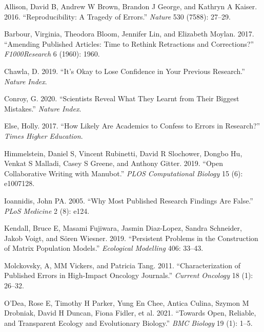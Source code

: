 \documentclass[
]{article}
\newlength{\cslhangindent}
\newlength{\cslentryspacingunit} %
\newenvironment{CSLReferences}[2] %
 {%
  \setlength{\parindent}{0pt}
  \ifodd #1
  \let\oldpar\par
  \def\par{\hangindent=\cslhangindent\oldpar}
  \fi
  \setlength{\parskip}{#2\cslentryspacingunit}
 }%
 {}
\begin{document}
\hypertarget{refs}{}
\begin{CSLReferences}{1}{0}
\leavevmode{}%
Allison, David B, Andrew W Brown, Brandon J George, and Kathryn A
Kaiser. 2016. {``Reproducibility: A Tragedy of Errors.''} \emph{Nature}
530 (7588): 27--29.

\leavevmode{}%
Barbour, Virginia, Theodora Bloom, Jennifer Lin, and Elizabeth Moylan.
2017. {``Amending Published Articles: Time to Rethink Retractions and
Corrections?''} \emph{F1000Research} 6 (1960): 1960.

\leavevmode{}%
Chawla, D. 2019. {``It's Okay to Lose Confidence in Your Previous
Research.''} \emph{Nature Index}.

\leavevmode{}%
Conroy, G. 2020. {``Scientists Reveal What They Learnt from Their
Biggest Mistakes.''} \emph{Nature Index}.

\leavevmode{}%
Else, Holly. 2017. {``How Likely Are Academics to Confess to Errors in
Research?''} \emph{Times Higher Education}.

\leavevmode{}%
Himmelstein, Daniel S, Vincent Rubinetti, David R Slochower, Dongbo Hu,
Venkat S Malladi, Casey S Greene, and Anthony Gitter. 2019. {``Open
Collaborative Writing with Manubot.''} \emph{PLOS Computational Biology}
15 (6): e1007128.

\leavevmode{}%
Ioannidis, John PA. 2005. {``Why Most Published Research Findings Are
False.''} \emph{PLoS Medicine} 2 (8): e124.

\leavevmode{}%
Kendall, Bruce E, Masami Fujiwara, Jasmin Diaz-Lopez, Sandra Schneider,
Jakob Voigt, and Sören Wiesner. 2019. {``Persistent Problems in the
Construction of Matrix Population Models.''} \emph{Ecological Modelling}
406: 33--43.

\leavevmode{}%
Molckovsky, A, MM Vickers, and Patricia Tang. 2011. {``Characterization
of Published Errors in High-Impact Oncology Journals.''} \emph{Current
Oncology} 18 (1): 26--32.

\leavevmode{}%
O'Dea, Rose E, Timothy H Parker, Yung En Chee, Antica Culina, Szymon M
Drobniak, David H Duncan, Fiona Fidler, et al. 2021. {``Towards Open,
Reliable, and Transparent Ecology and Evolutionary Biology.''} \emph{BMC
Biology} 19 (1): 1--5.


\end{CSLReferences}
\end{document}
